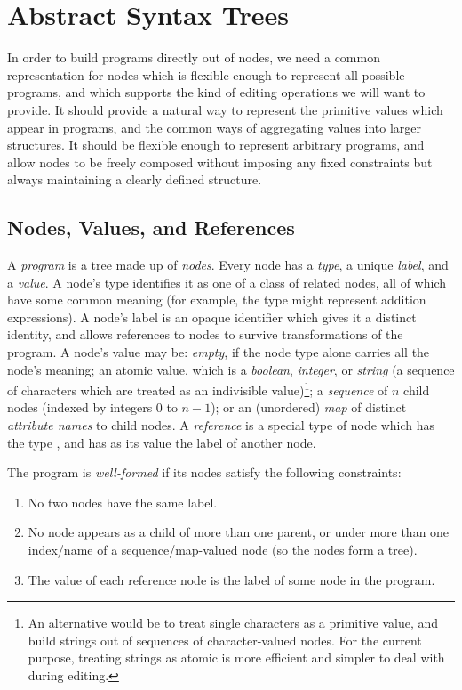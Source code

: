 \section{Abstract Syntax Trees}
In order to build programs directly out of nodes, we need a common representation for nodes which is flexible enough to represent all possible programs, and which supports the kind of editing operations we will want to provide. It should provide a natural way to represent the primitive values which appear in programs, and the common ways of aggregating values into larger structures. It should be flexible enough to represent arbitrary programs, and allow nodes to be freely composed without imposing any fixed constraints but always maintaining a clearly defined structure.


\subsection{Nodes, Values, and References}
A \emph{program} is a tree made up of \emph{nodes}. Every node has a \emph{type}, a unique \emph{label}, and a \emph{value}. A node's type identifies it as one of a class of related nodes, all of which have some common meaning (for example, the type  might represent addition expressions). A node's label is an opaque identifier which gives it a distinct identity, and allows references to nodes to survive transformations of the program. A node's value may be: \emph{empty}, if the node type alone carries all the node's meaning; an atomic value, which is a \emph{boolean}, \emph{integer}, or \emph{string} (a sequence of characters which are treated as an indivisible value)\footnote{An alternative would be to treat single characters as a primitive value, and build strings out of sequences of character-valued nodes. For the current purpose, treating strings as atomic is more efficient and simpler to deal with during editing.}; a \emph{sequence} of $n$ child nodes (indexed by integers $0$ to $n-1$); or an (unordered) \emph{map} of distinct \emph{attribute names} to child nodes. A \emph{reference} is a special type of node which has the type , and has as its value the label of another node.

The program is \emph{well-formed} if its nodes satisfy the following constraints:
\begin{enumerate}
\item No two nodes have the same label.
\item No node appears as a child of more than one parent, or under more than one index/name of a sequence/map-valued node (so the nodes form a tree).
\item The value of each reference node is the label of some node in the program.
\end{enumerate}

